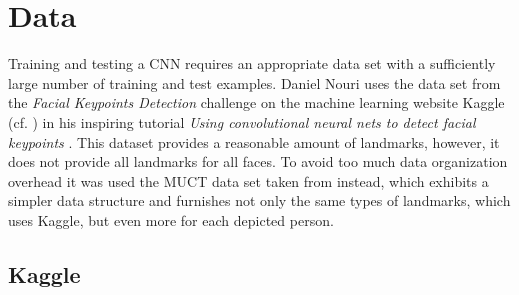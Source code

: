 \documentclass[11pt, a4paper]{article}
\begin{document}

\section{Data}
\label{sec:data}

Training and testing a \ac{CNN} requires an appropriate data set with a sufficiently large number of training and test examples. Daniel Nouri uses the data set from the \emph{Facial Keypoints Detection} challenge on the machine learning website Kaggle (cf. \cite{kaggle}) in his inspiring tutorial \emph{Using convolutional neural nets to detect facial keypoints} \cite{nouri-tutorial}. This dataset provides a reasonable amount of landmarks, however, it does not provide all landmarks for all faces. To avoid too much data organization overhead it was used the \ac{MUCT} data set taken from \cite{muct} instead, which exhibits a simpler data structure and furnishes not only the same types of landmarks, which uses Kaggle, but even more for each depicted person.

\subsection{Kaggle}
\end{document}
